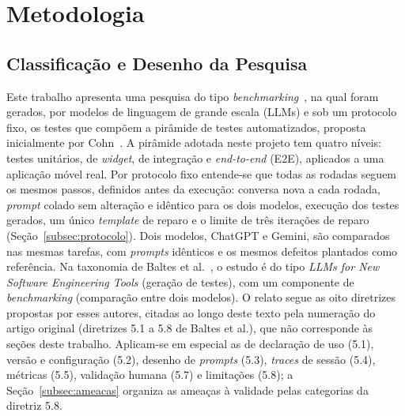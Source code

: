 \documentclass[12pt]{article}
\begin{document}
\section{Metodologia}
\label{sec:metodologia}

\subsection{Classificação e Desenho da Pesquisa}
\label{subsec:desenho}

Este trabalho apresenta uma pesquisa do tipo
\textit{benchmarking}~\cite{ralph2021empirical}, na qual foram gerados, por
modelos de linguagem de grande escala (LLMs) e sob um protocolo fixo, os
testes que compõem a pirâmide de testes automatizados, proposta inicialmente
por Cohn~\cite{cohn2009}. A pirâmide adotada neste projeto tem quatro níveis:
testes unitários, de \textit{widget}, de integração e \textit{end-to-end}
(E2E), aplicados a uma aplicação móvel real. Por protocolo fixo entende-se
que todas as rodadas seguem os mesmos passos, definidos antes da execução:
conversa nova a cada rodada, \textit{prompt} colado sem alteração e idêntico
para os dois modelos, execução dos testes gerados, um único \textit{template}
de reparo e o limite de três iterações de reparo
(Seção~\ref{subsec:protocolo}). Dois modelos, ChatGPT e Gemini,
são comparados nas mesmas tarefas, com \textit{prompts} idênticos e os mesmos
defeitos plantados como referência. Na taxonomia de Baltes et
al.~\cite{baltes2026guidelines}, o estudo é do tipo \textit{LLMs for New
Software Engineering Tools} (geração de testes), com um componente de
\textit{benchmarking} (comparação entre dois modelos). O relato segue as oito diretrizes propostas por esses autores,
citadas ao longo deste texto pela numeração do artigo original (diretrizes
5.1 a 5.8 de Baltes et al.), que não corresponde às seções deste trabalho.
Aplicam-se em especial as de declaração de uso (5.1), versão e configuração (5.2),
desenho de \textit{prompts} (5.3), \textit{traces} de sessão (5.4), métricas
(5.5), validação humana (5.7) e limitações (5.8); a Seção~\ref{subsec:ameacas}
organiza as ameaças à validade pelas categorias da diretriz 5.8.
\end{document}
